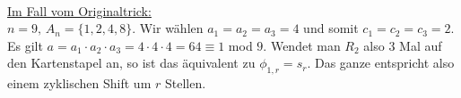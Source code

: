 \documentclass[a4paper]{article}
\begin{document}
   \noindent {} \\
   
   \noindent \underline{Im Fall vom Originaltrick:} \\
   $n=9, \, A_n=\lbrace 1,2,4,8\rbrace$. Wir wählen $a_1 = a_2 = a_3 = 4$ und somit $c_1 = c_2 = c_3 = 2$. \\
   Es gilt $a = a_1 \cdot a_2 \cdot a_3 = 4 \cdot 4 \cdot 4 = 64 \equiv 1$ mod $9$. Wendet man $R_2$ also 3 Mal auf den Kartenstapel an, so ist das äquivalent zu $\phi_{1,r} = s_r$. Das ganze entspricht also einem zyklischen Shift um $r$ Stellen.
   
\end{document}
